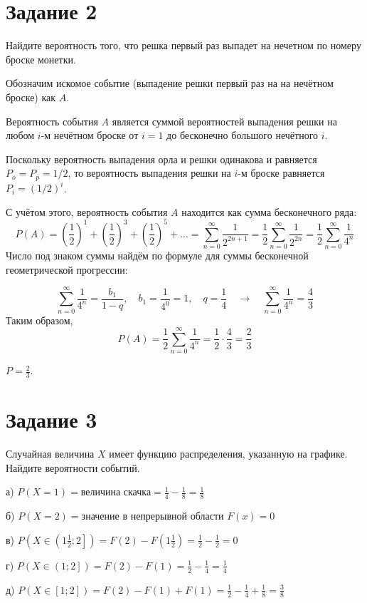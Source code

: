 \documentclass[a4paper,12pt]{article}
\newcommand{\ssolve}{\par\vspace{5pt}\noindent{\bf Решение. }\par}
\newcommand{\aanswer}{\par\vspace{5pt}\noindent{\bf Ответ. }}
\newcommand{\llaq}{\quad \longrightarrow \quad}
\begin{document}
\section*{Задание 2}
Найдите вероятность того, что решка первый раз выпадет на нечетном по номеру
броске монетки.
\ssolve
Обозначим искомое событие (выпадение решки первый раз на на нечётном броске) как $A$. \par
Вероятность события $A$ является суммой вероятностей выпадения решки на любом $i$-м нечётном броске от $i=1$ до бесконечно большого нечётного $i$. \par
Поскольку вероятность выпадения орла и решки одинакова и равняется $P_o=P_p=1/2$, то вероятность выпадения решки на $i$-м броске равняется $P_i=(1/2)^i$. \par
С учётом этого, вероятность события $A$ находится как сумма бесконечного ряда:
$$P(A)=\left(\frac{1}{2}\right)^1+\left(\frac{1}{2}\right)^3+\left(\frac{1}{2}\right)^5+ \ldots = \sum_{n=0}^\infty \frac{1}{2^{2n+1}}=\frac{1}{2}\sum_{n=0}^\infty \frac{1}{2^{2n}}=\frac{1}{2}\sum_{n=0}^\infty \frac{1}{4^n}$$
Число под знаком суммы найдём по формуле для суммы бесконечной геометрической прогрессии:\par
$$\sum_{n=0}^\infty \frac{1}{4^n}=\frac{b_1}{1-q}, \quad b_1 = \frac{1}{4^0}=1 ,\quad  q=\frac{1}{4} \llaq \sum_{n=0}^\infty \frac{1}{4^n}=\frac{4}{3}$$ 
Таким образом,
$$P(A)=\frac{1}{2}\sum_{n=0}^\infty \frac{1}{4^n} = \frac{1}{2} \cdot \frac{4}{3} = \frac{2}{3}$$
\aanswer $P = \frac{2}{3}$.
\section*{Задание 3}
Случайная величина $X$ имеет функцию распределения, указанную на графике.
Найдите вероятности событий.
\ssolve 
а) $P(X=1) = \text{величина скачка} = \frac{1}{4} - \frac{1}{8} = \frac{1}{8}$ \par
б) $P(X=2) = \text{значение в непрерывной области } F(x) = 0$ \par
в) $P(X \in \left( 1 \frac{1}{2}; 2 \right]) = F(2) - F(1 \frac{1}{2}) = \frac{1}{2} - \frac{1}{2} = 0$ \par
г) $P(X \in \left( 1 ; 2 \right]) = F(2) - F(1) = \frac{1}{2} - \frac{1}{4} = \frac{1}{4}$ \par
д) $P(X \in \left[ 1 ; 2 \right]) = F(2) - F(1) + F(1) = \frac{1}{2} - \frac{1}{4} + \frac{1}{8} = \frac{3}{8}$ \par
\end{document}
